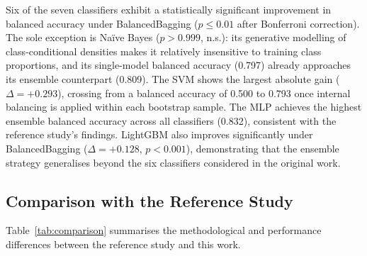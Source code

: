 \documentclass[preprint,12pt]{elsarticle}
\begin{document}
Six of the seven classifiers exhibit a statistically significant improvement in
balanced accuracy under BalancedBagging ($p \leq 0.01$ after Bonferroni
correction). The sole exception is Naïve Bayes ($p > 0.999$, n.s.): its generative
modelling of class-conditional densities makes it relatively insensitive to
training class proportions, and its single-model balanced accuracy (0.797) already
approaches its ensemble counterpart (0.809). The SVM shows the largest absolute
gain ($\Delta = +0.293$), crossing from a balanced accuracy of 0.500 to 0.793
once internal balancing is applied within each bootstrap sample. The MLP achieves
the highest ensemble balanced accuracy across all classifiers (0.832), consistent
with the reference study's findings. LightGBM also improves significantly under
BalancedBagging ($\Delta = +0.128$, $p < 0.001$), demonstrating that the ensemble
strategy generalises beyond the six classifiers considered in the original work.

\subsection{Comparison with the Reference Study}

Table~\ref{tab:comparison} summarises the methodological and performance
differences between the reference study and this work.

\begin{table}[ht!]
  \centering
  \caption{Direct comparison between Papaiz et al.~\cite{Papaiz2024} and this
    work. \textsuperscript{a}Best ensemble balanced accuracy reported under
    repeated CV. \textsuperscript{b}Not reported in the reference study.}
  \label{tab:comparison}
\end{table}
\end{document}
